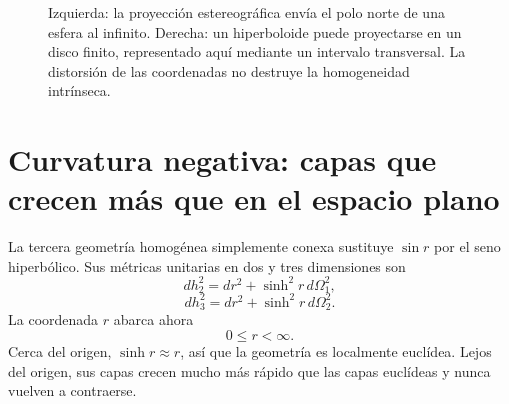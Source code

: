 \begin{figure}[htbp]
\centering
{}%
\caption{Izquierda: la proyección estereográfica envía el polo norte de una esfera al infinito. Derecha: un hiperboloide puede proyectarse en un disco finito, representado aquí mediante un intervalo transversal. La distorsión de las coordenadas no destruye la homogeneidad intrínseca.}
\label{fig:c03-projections}
\end{figure}

\section{Curvatura negativa: capas que crecen más que en el espacio plano}

La tercera geometría homogénea simplemente conexa sustituye \(\sin r\) por el seno hiperbólico. Sus métricas unitarias en dos y tres dimensiones son
\begin{equation}
dh_2^2 = dr^2 + \sinh^2 r\, d\Omega_1^2,
\label{eq:c03-hyperbolic-two}
\end{equation}
\begin{equation}
dh_3^2 = dr^2 + \sinh^2 r\, d\Omega_2^2.
\label{eq:c03-hyperbolic-three}
\end{equation}
La coordenada \(r\) abarca ahora
\begin{equation}
0\le r<\infty.
\end{equation}
Cerca del origen, \(\sinh r\approx r\), así que la geometría es localmente euclídea. Lejos del origen, sus capas crecen mucho más rápido que las capas euclídeas y nunca vuelven a contraerse.


